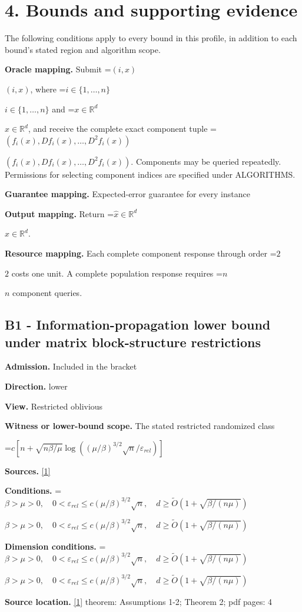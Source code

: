 \documentclass[10pt,a4paper]{article}
\newcommand{\AtlasMath}[1]{\par\begingroup\centering\setbox0=\hbox{$\displaystyle #1$}\ifdim\wd0>1.4\linewidth\typeout{ATLAS WIDE FORMULA: \the\wd0}\fi\ifdim\wd0>\linewidth\resizebox{\linewidth}{!}{\box0}\else\box0\fi\par\endgroup}
\newcommand{\AtlasInlineMath}[1]{\begingroup\setbox0=\hbox{$#1$}\ifdim\wd0>.4\linewidth\endgroup\AtlasMath{#1}\else\endgroup$#1$\fi}
\begin{document}
\section{4. Bounds and supporting evidence}
The following conditions apply to every bound in this profile, in addition to each bound's stated region and algorithm scope.

\textbf{Oracle mapping.} Submit \AtlasInlineMath{(i,x)}, where \AtlasInlineMath{i\in\{1,\ldots,n\}} and \AtlasInlineMath{x\in\mathbb{R}^d}, and receive the complete exact component tuple \AtlasInlineMath{(f_i(x),Df_i(x),\ldots,D^{2}f_i(x))}. Components may be queried repeatedly. Permissions for selecting component indices are specified under ALGORITHMS.

\textbf{Guarantee mapping.} Expected-error guarantee for every instance

\textbf{Output mapping.} Return \AtlasInlineMath{\widehat{x}\in \mathbb{R}^d}.

\textbf{Resource mapping.} Each complete component response through order \AtlasInlineMath{2} costs one unit. A complete population response requires \AtlasInlineMath{n} component queries.

\subsection{B1 - Information-propagation lower bound under matrix block-structure restrictions}
\textbf{Admission.} Included in the bracket

\textbf{Direction.} lower

\textbf{View.} Restricted oblivious

\textbf{Witness or lower-bound scope.} The stated restricted randomized class

\AtlasMath{c[n+\sqrt{n\beta/\mu}\log((\mu/\beta)^{3/2}\sqrt n/\varepsilon_{rel})]}
\textbf{Sources.} \href{https://proceedings.mlr.press/v70/arjevani17a/arjevani17a.pdf}{[1]}

\textbf{Conditions.} \AtlasInlineMath{\beta>\mu>0,\quad0<\varepsilon_{rel}\le c(\mu/\beta)^{3/2}\sqrt n,\quad d\ge\widetilde{O}(1+\sqrt{\beta/(n\mu)})}

\textbf{Dimension conditions.} \AtlasInlineMath{\beta>\mu>0,\quad0<\varepsilon_{rel}\le c(\mu/\beta)^{3/2}\sqrt n,\quad d\ge\widetilde{O}(1+\sqrt{\beta/(n\mu)})}

\textbf{Source location.} \href{https://proceedings.mlr.press/v70/arjevani17a/arjevani17a.pdf}{[1]} theorem: Assumptions 1-2; Theorem 2; pdf pages: 4
\end{document}
